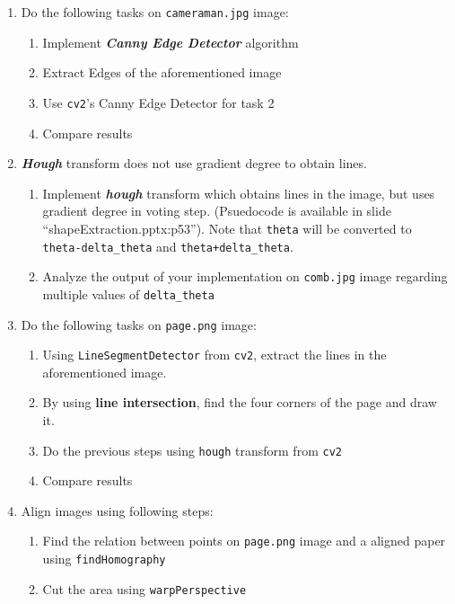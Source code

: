 \documentclass[11pt]{article}
\providecommand{\tightlist}{%
      \setlength{\itemsep}{0pt}\setlength{\parskip}{0pt}}
\begin{document}
\begin{enumerate}
\def\labelenumi{\arabic{enumi}.}
\tightlist
\item
  Do the following tasks on \texttt{cameraman.jpg} image:

  \begin{enumerate}
  \def\labelenumii{\arabic{enumii}.}
  \tightlist
  \item
    Implement \emph{\textbf{Canny Edge Detector}} algorithm
  \item
    Extract Edges of the aforementioned image
  \item
    Use \texttt{cv2}'s Canny Edge Detector for task 2
  \item
    Compare results
  \end{enumerate}
\item
  \emph{\textbf{Hough}} transform does not use gradient degree to obtain
  lines.

  \begin{enumerate}
  \def\labelenumii{\arabic{enumii}.}
  \tightlist
  \item
    Implement \emph{\textbf{hough}} transform which obtains lines in the
    image, but uses gradient degree in voting step. (Psuedocode is
    available in slide ``shapeExtraction.pptx:p53''). Note that
    \texttt{theta} will be converted to \texttt{theta-delta\_theta} and
    \texttt{theta+delta\_theta}.
  \item
    Analyze the output of your implementation on \texttt{comb.jpg} image
    regarding multiple values of \texttt{delta\_theta}
  \end{enumerate}
\item
  Do the following tasks on \texttt{page.png} image:

  \begin{enumerate}
  \def\labelenumii{\arabic{enumii}.}
  \tightlist
  \item
    Using \texttt{LineSegmentDetector} from \texttt{cv2}, extract the
    lines in the aforementioned image.
  \item
    By using \textbf{line intersection}, find the four corners of the
    page and draw it.
  \item
    Do the previous steps using \texttt{hough} transform from
    \texttt{cv2}
  \item
    Compare results
  \end{enumerate}
\item
  Align images using following steps:

  \begin{enumerate}
  \def\labelenumii{\arabic{enumii}.}
  \tightlist
  \item
    Find the relation between points on \texttt{page.png} image and a
    aligned paper using \texttt{findHomography}
  \item
    Cut the area using \texttt{warpPerspective}
  \end{enumerate}
\end{enumerate}
\end{document}
